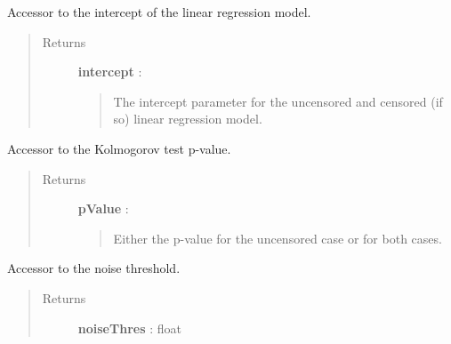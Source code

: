 \documentclass[letterpaper,10pt,english]{sphinxmanual}
\begin{document}
\begin{fulllineitems}
\begin{fulllineitems}
\label{_generated/otpod.UnivariateLinearModelAnalysis:otpod.UnivariateLinearModelAnalysis.getIntercept}
Accessor to the intercept of the linear regression model.
\begin{quote}\begin{description}
\item[{Returns}] \leavevmode
\textbf{intercept} : \href{http://doc.openturns.org/openturns-latest/sphinx/user\_manual/\_generated/openturns.NumericalPoint.html\#openturns.NumericalPoint}{}
\begin{quote}

The intercept parameter for the uncensored and censored (if so) linear
regression model.
\end{quote}

\end{description}\end{quote}

\end{fulllineitems}


\begin{fulllineitems}
\label{_generated/otpod.UnivariateLinearModelAnalysis:otpod.UnivariateLinearModelAnalysis.getKolmogorovPValue}
Accessor to the Kolmogorov test p-value.
\begin{quote}\begin{description}
\item[{Returns}] \leavevmode
\textbf{pValue} : \href{http://doc.openturns.org/openturns-latest/sphinx/user\_manual/\_generated/openturns.NumericalPoint.html\#openturns.NumericalPoint}{}
\begin{quote}

Either the p-value for the uncensored case or for both cases.
\end{quote}

\end{description}\end{quote}

\end{fulllineitems}


\begin{fulllineitems}
\label{_generated/otpod.UnivariateLinearModelAnalysis:otpod.UnivariateLinearModelAnalysis.getNoiseThreshold}
Accessor to the noise threshold.
\begin{quote}\begin{description}
\item[{Returns}] \leavevmode
\textbf{noiseThres} : float
\begin{quote}


\end{quote}
\end{description}
\end{quote}
\end{fulllineitems}
\end{fulllineitems}
\end{document}
